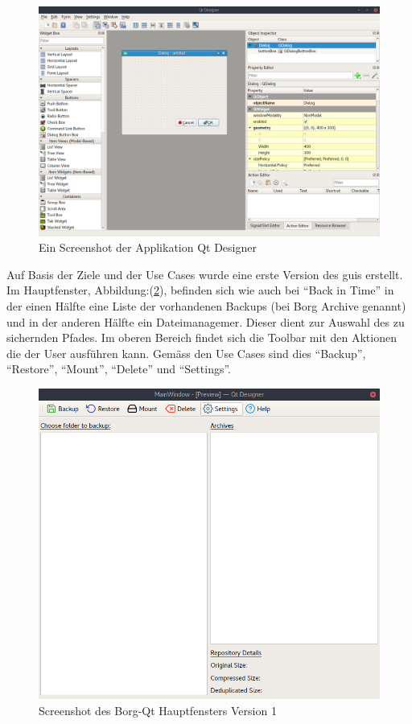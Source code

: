 \begin{figure}[htbp]
\centering
\includegraphics[width=.9\linewidth]{pictures/qt_designer.png}
\caption{\label{fig:org663b709}
Ein Screenshot der Applikation Qt Designer}
\end{figure}
Auf Basis der Ziele und der Use Cases wurde eine erste Version des \glspl{gui}
erstellt. Im Hauptfenster, Abbildung:(\ref{fig:org2e387c6}), befinden sich wie
auch bei "`Back in Time"' in der einen Hälfte eine Liste der vorhandenen Backups
(bei Borg Archive genannt) und in der anderen Hälfte ein Dateimanagemer. Dieser
dient zur Auswahl des zu sichernden Pfades. Im oberen Bereich findet sich die
Toolbar mit den Aktionen die der User ausführen kann. Gemäss den Use Cases sind
dies "`Backup"', "`Restore"', "`Mount"', "`Delete"' und "`Settings"'.

\begin{figure}[H]
\centering
\includegraphics[width=.9\linewidth]{pictures/borgqt_main_v1.png}
\caption{\label{fig:org2e387c6}
Screenshot des Borg-Qt Hauptfensters Version 1}
\end{figure}

